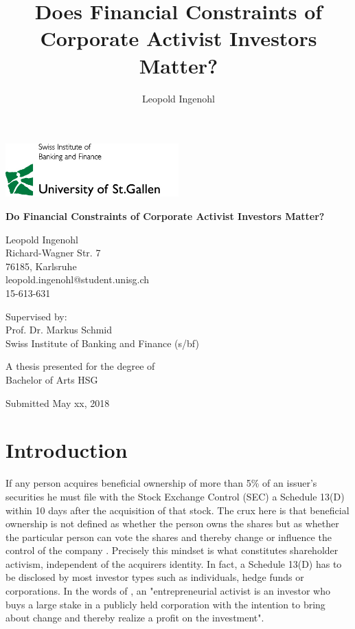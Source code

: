 \documentclass[12pt]{article}
\title{Does Financial Constraints of Corporate Activist Investors Matter?}
\author{Leopold Ingenohl}
\begin{document}
\begin{titlepage}
    \begin{center}
       
        \includegraphics[width=0.5\textwidth]{Logo.jpg}
       
        \vspace*{1.5cm}
		\huge
        \textbf{Do Financial Constraints of Corporate Activist Investors Matter?}

        \vspace{1.5cm}
		\normalsize
        Leopold Ingenohl\\
        Richard-Wagner Str. 7\\
        76185, Karlsruhe\\
        leopold.ingenohl@student.unisg.ch\\
        15-613-631

        \vspace{1.5cm}
        Supervised by:\\
        Prof. Dr. Markus Schmid\\
        Swiss Institute of Banking and Finance (s/bf)\\
        \vfill

        A thesis presented for the degree of\\
        Bachelor of Arts HSG

        \vspace{0.8cm}

        Submitted May xx, 2018

	\end{center}
	
\end{titlepage}

\tableofcontents
\listoftables
\listoffigures

\section{Introduction}

If any person acquires beneficial ownership of more than 5\% of an issuer's securities he must file with the Stock Exchange Control (SEC) a Schedule 13(D) within 10 days after the acquisition of that stock. The crux here is that beneficial ownership is not defined as whether the person owns the shares but as whether the particular person can vote the shares and thereby change or influence the control of the company \citep[p.24]{Morrison2015}. Precisely this mindset is what constitutes shareholder activism, independent of the acquirers identity. In fact, a Schedule 13(D) has to be disclosed by most investor types such as individuals, hedge funds or corporations. In the words of \citet[p.187]{Klein2009}, an "entrepreneurial activist is an investor who buys a large stake in a publicly held corporation with the intention to bring about change and thereby realize a profit on the investment". 
\end{document}
